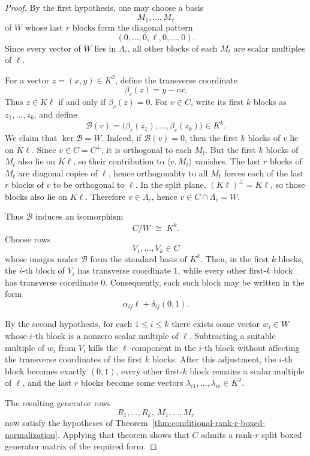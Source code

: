 \documentclass[12pt]{article}
\begin{document}
\begin{proof}
By the first hypothesis, one may choose a basis
\[
M_1,\dots,M_r
\]
of \(W\) whose last \(r\) blocks form the diagonal pattern
\[
(0,\dots,0,\ell,0,\dots,0).
\]
Since every vector of \(W\) lies in \(\Lambda_c\), all other blocks of each \(M_t\) are scalar multiples of \(\ell\).

For a vector \(z=(x,y)\in K^2\), define the transverse coordinate
\[
\beta_c(z)=y-cx.
\]
Thus \(z\in K\ell\) if and only if \(\beta_c(z)=0\). For \(v\in C\), write its first \(k\) blocks as \(z_1,\dots,z_k\), and define
\[
\mathcal B(v)=\bigl(\beta_c(z_1),\dots,\beta_c(z_k)\bigr)\in K^k.
\]
We claim that \(\ker \mathcal B=W\). Indeed, if \(\mathcal B(v)=0\), then the first \(k\) blocks of \(v\) lie on \(K\ell\). Since \(v\in C=C^\perp\), it is orthogonal to each \(M_t\). But the first \(k\) blocks of \(M_t\) also lie on \(K\ell\), so their contribution to \(\langle v,M_t\rangle\) vanishes. The last \(r\) blocks of \(M_t\) are diagonal copies of \(\ell\), hence orthogonality to all \(M_t\) forces each of the last \(r\) blocks of \(v\) to be orthogonal to \(\ell\). In the split plane, \((K\ell)^\perp=K\ell\), so those blocks also lie on \(K\ell\). Therefore \(v\in \Lambda_c\), hence \(v\in C\cap\Lambda_c=W\).

Thus \(\mathcal B\) induces an isomorphism
\[
C/W \;\cong\; K^k.
\]
Choose rows
\[
V_1,\dots,V_k\in C
\]
whose images under \(\mathcal B\) form the standard basis of \(K^k\). Then, in the first \(k\) blocks, the \(i\)-th block of \(V_i\) has transverse coordinate \(1\), while every other first-\(k\) block has transverse coordinate \(0\). Consequently, each such block may be written in the form
\[
\alpha_{ij}\ell+\delta_{ij}(0,1).
\]

By the second hypothesis, for each \(1\le i\le k\) there exists some vector \(w_i\in W\) whose \(i\)-th block is a nonzero scalar multiple of \(\ell\). Subtracting a suitable multiple of \(w_i\) from \(V_i\) kills the \(\ell\)-component in the \(i\)-th block without affecting the transverse coordinates of the first \(k\) blocks. After this adjustment, the \(i\)-th block becomes exactly \((0,1)\), every other first-\(k\) block remains a scalar multiple of \(\ell\), and the last \(r\) blocks become some vectors \(\lambda_{i1},\dots,\lambda_{ir}\in K^2\).

The resulting generator rows
\[
R_1,\dots,R_k,\ M_1,\dots,M_r
\]
now satisfy the hypotheses of Theorem~\ref{thm:conditional-rank-r-boxed-normalization}. Applying that theorem shows that \(C\) admits a rank-\(r\) split boxed generator matrix of the required form.
\end{proof}
\end{document}
